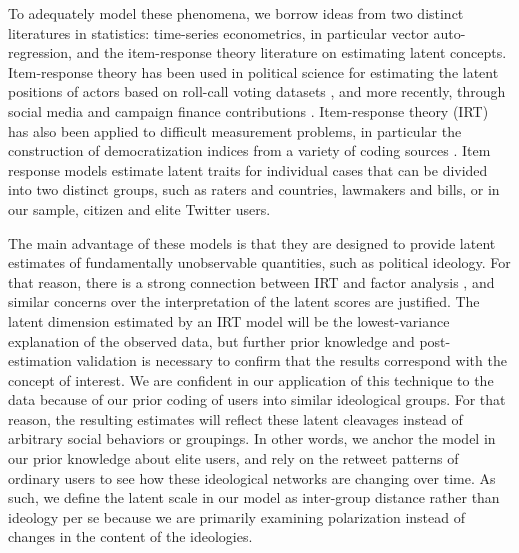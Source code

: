 \documentclass[12pt]{article}
\begin{document}
 To adequately model these phenomena, we borrow ideas from two distinct literatures in statistics: time-series econometrics, in particular vector auto-regression, and the item-response theory literature on estimating latent concepts. Item-response theory has been used in political science for estimating the latent positions of actors based on roll-call voting datasets \parencite{jackman2004}, and more recently, through social media and campaign finance contributions \parencite{bonica2014,barbera2015}. Item-response theory (IRT) has also been applied to difficult measurement problems, in particular the construction of democratization indices from a variety of coding sources \parencite{vdem2017,treier2008}. Item response models estimate latent traits for individual cases that can be divided into two distinct groups, such as raters and countries, lawmakers and bills, or in our sample, citizen and elite Twitter users. 

The main advantage of these models is that they are designed to provide latent estimates of fundamentally unobservable quantities, such as political ideology. For that reason, there is a strong connection between IRT and factor analysis \parencite{takane1986}, and similar concerns over the interpretation of the latent scores are justified. The latent dimension estimated by an IRT model will be the lowest-variance explanation of the observed data, but further prior knowledge and post-estimation validation is necessary to confirm that the results correspond with the concept of interest. We are confident in our application of this technique to the data because of our prior coding of users into similar ideological groups. For that reason, the resulting estimates will reflect these latent cleavages instead of arbitrary social behaviors or groupings. In other words, we anchor the model in our prior knowledge about elite users, and rely on the retweet patterns of ordinary users to see how these ideological networks are changing over time. As such, we define the latent scale in our model as inter-group distance rather than ideology per se because we are primarily examining polarization instead of changes in the content of the ideologies.
\end{document}
